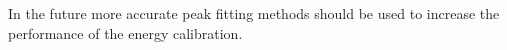 In the future more accurate peak fitting methods should be used to increase the performance of the energy calibration. 
